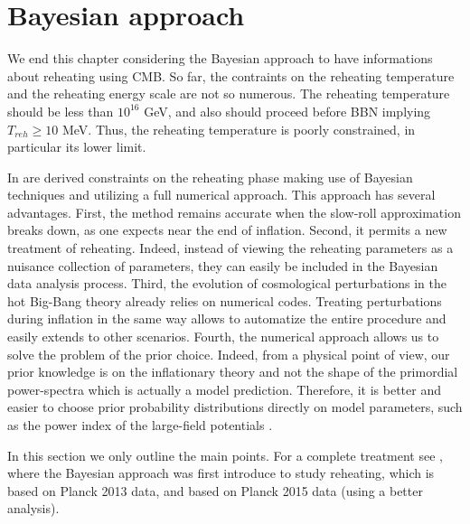 \documentclass[11pt,a4paper,twoside]{book}
\begin{document}
 \section{Bayesian approach}
 We end this chapter considering the Bayesian approach to have informations about reheating using CMB. So far, the contraints on the reheating temperature and the reheating energy scale are not so numerous. The reheating temperature should be less than $ 10^{16}  $ GeV, and also should proceed before BBN implying $ T_{reh} \ge 10 $ MeV. Thus, the reheating temperature is poorly constrained, in particular its lower limit.
 
 In \cite{Chap3:Martin_Ringeval} are derived constraints on the reheating phase making use of Bayesian techniques and utilizing a full numerical approach. This approach has several advantages. First, the method remains accurate when the slow-roll approximation breaks down, as one expects near the end of inflation. Second, it permits a new treatment of reheating. Indeed, instead of viewing the reheating parameters as a nuisance collection of parameters, they can easily be included in the Bayesian data analysis process. Third, the evolution of cosmological perturbations in the hot Big-Bang theory already relies on numerical codes. Treating perturbations during inflation in the same way allows to automatize the entire procedure and easily extends to other scenarios. Fourth, the numerical approach allows us to solve the problem of the prior choice. Indeed, from a physical point of view, our prior knowledge is on the inflationary theory and not the shape of the primordial power-spectra which is actually a model prediction. Therefore, it is better and easier to choose prior probability distributions directly on model parameters, such as the power index of the large-field potentials \cite{Chap3:Martin_Ringeval}.
 
 In this section we only outline the main points. For a complete treatment see \cite{Chap3:Martin_Ringeval}, where the Bayesian approach was first introduce to study reheating, \cite{Chap3:Martin_Observing_Reheating} which is based on Planck 2013 data, and \cite{Chap3:Martin_Milestone} based on Planck 2015 data (using a better analysis).
 
\end{document}
